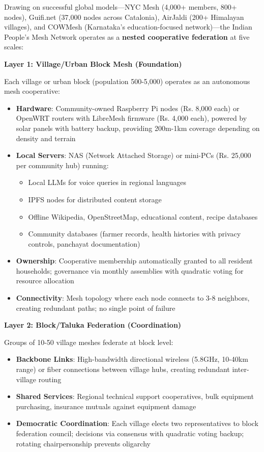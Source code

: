 Drawing on successful global models---NYC Mesh (4,000+ members, 800+
nodes), Guifi.net (37,000 nodes across Catalonia), AirJaldi (200+
Himalayan villages), and COWMesh (Karnataka's education-focused
network)---the Indian People's Mesh Network operates as a \textbf{nested
cooperative federation} at five scales:

\textbf{Layer 1: Village/Urban Block Mesh (Foundation)}

Each village or urban block (population 500-5,000) operates as an
autonomous mesh cooperative:

\begin{itemize}
\tightlist
\item
  \textbf{Hardware}: Community-owned Raspberry Pi nodes (Rs. 8,000 each)
  or OpenWRT routers with LibreMesh firmware (Rs. 4,000 each), powered
  by solar panels with battery backup, providing 200m-1km coverage
  depending on density and terrain
\item
  \textbf{Local Servers}: NAS (Network Attached Storage) or mini-PCs
  (Rs. 25,000 per community hub) running:

  \begin{itemize}
  \tightlist
  \item
    Local LLMs for voice queries in regional languages
  \item
    IPFS nodes for distributed content storage
  \item
    Offline Wikipedia, OpenStreetMap, educational content, recipe
    databases
  \item
    Community databases (farmer records, health histories with privacy
    controls, panchayat documentation)
  \end{itemize}
\item
  \textbf{Ownership}: Cooperative membership automatically granted to
  all resident households; governance via monthly assemblies with
  quadratic voting for resource allocation
\item
  \textbf{Connectivity}: Mesh topology where each node connects to 3-8
  neighbors, creating redundant paths; no single point of failure
\end{itemize}

\textbf{Layer 2: Block/Taluka Federation (Coordination)}

Groups of 10-50 village meshes federate at block level:

\begin{itemize}
\tightlist
\item
  \textbf{Backbone Links}: High-bandwidth directional wireless (5.8GHz,
  10-40km range) or fiber connections between village hubs, creating
  redundant inter-village routing
\item
  \textbf{Shared Services}: Regional technical support cooperatives,
  bulk equipment purchasing, insurance mutuals against equipment damage
\item
  \textbf{Democratic Coordination}: Each village elects two
  representatives to block federation council; decisions via consensus
  with quadratic voting backup; rotating chairpersonship prevents
  oligarchy
\end{itemize}

